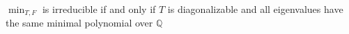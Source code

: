 \documentclass[preview]{standalone}
\begin{document}
\begin{center}
$\min_{T, F}$ is irreducible if and only if $T$ is diagonalizable and all eigenvalues have the same minimal polynomial over $\mathbb{Q}$
\end{center}
\end{document}
